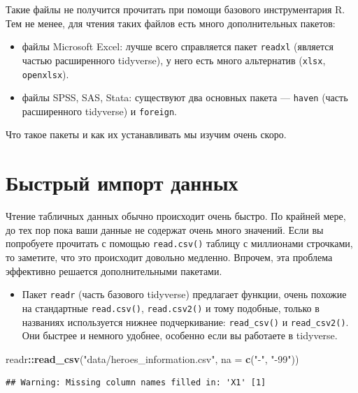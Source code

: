 \documentclass[]{book}
\newenvironment{Shaded}{\begin{snugshade}}{\end{snugshade}}
\newcommand{\KeywordTok}[1]{\textcolor[rgb]{0.13,0.29,0.53}{\textbf{#1}}}
\newcommand{\DataTypeTok}[1]{\textcolor[rgb]{0.13,0.29,0.53}{#1}}
\newcommand{\StringTok}[1]{\textcolor[rgb]{0.31,0.60,0.02}{#1}}
\newcommand{\OperatorTok}[1]{\textcolor[rgb]{0.81,0.36,0.00}{\textbf{#1}}}
\newcommand{\NormalTok}[1]{#1}
\providecommand{\tightlist}{%
  \setlength{\itemsep}{0pt}\setlength{\parskip}{0pt}}
\begin{document}
Такие файлы не получится прочитать при помощи базового инструментария R.
Тем не менее, для чтения таких файлов есть много дополнительных пакетов:

\begin{itemize}
\item
  файлы Microsoft Excel: лучше всего справляется пакет \texttt{readxl}
  (является частью расширенного tidyverse), у него есть много
  альтернатив (\texttt{xlsx}, \texttt{openxlsx}).
\item
  файлы SPSS, SAS, Stata: существуют два основных пакета ---
  \texttt{haven} (часть расширенного tidyverse) и \texttt{foreign}.
\end{itemize}

Что такое пакеты и как их устанавливать мы изучим очень скоро.

\section{Быстрый импорт данных}\label{fastread}

Чтение табличных данных обычно происходит очень быстро. По крайней мере,
до тех пор пока ваши данные не содержат очень много значений. Если вы
попробуете прочитать с помощью \texttt{read.csv()} таблицу с миллионами
строчками, то заметите, что это происходит довольно медленно. Впрочем,
эта проблема эффективно решается дополнительными пакетами.

\begin{itemize}
\tightlist
\item
  Пакет \texttt{readr} (часть базового tidyverse) предлагает функции,
  очень похожие на стандартные \texttt{read.csv()}, \texttt{read.csv2()}
  и тому подобные, только в названиях используется нижнее подчеркивание:
  \texttt{read\_csv()} и \texttt{read\_csv2()}. Они быстрее и немного
  удобнее, особенно если вы работаете в tidyverse.
\end{itemize}

\begin{Shaded}
\begin{Highlighting}[]
\NormalTok{readr}\OperatorTok{::}\KeywordTok{read_csv}\NormalTok{(}\StringTok{"data/heroes_information.csv"}\NormalTok{,}
         \DataTypeTok{na =} \KeywordTok{c}\NormalTok{(}\StringTok{"-"}\NormalTok{, }\StringTok{"-99"}\NormalTok{))}
\end{Highlighting}
\end{Shaded}

\begin{verbatim}
## Warning: Missing column names filled in: 'X1' [1]
\end{verbatim}
\end{document}
